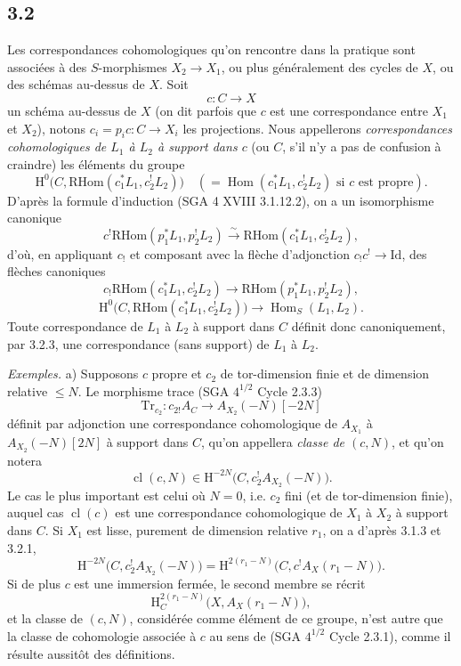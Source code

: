 \documentclass[11pt]{article}
\renewcommand{\H}{\mathrm{H}}
\DeclareMathOperator{\Hom}{Hom}
\providecommand{\RHom}{\mathrm{RHom}}
\providecommand{\Id}{\mathrm{Id}}
\providecommand{\RHom}{\mathrm{RHom}}
\providecommand{\Hom}{\operatorname{Hom}}
\providecommand{\RHom}{\mathrm R\mathcal{H}om}
\providecommand{\RHom}{\mathrm{RHom}}
\providecommand{\Hom}{\operatorname{Hom}}
\begin{document}
\subsection*{3.2}
Les correspondances cohomologiques qu'on rencontre dans la pratique sont associées à des $S$-morphismes $X_2\to X_1$, ou plus généralement des cycles de $X$, ou des schémas au-dessus de $X$. Soit
\[
c:C\longrightarrow X
\]
un schéma au-dessus de $X$ (on dit parfois que $c$ est une correspondance entre $X_1$ et $X_2$), notons $c_i=p_ic:C\to X_i$ les projections. Nous appellerons \emph{correspondances cohomologiques de $L_1$ à $L_2$ à support dans $c$} (ou $C$, s'il n'y a pas de confusion à craindre) les éléments du groupe
\[
\H^0\bigl(C,\RHom(c_1^*L_1,c_2^!L_2)\bigr)
\quad(=\Hom(c_1^*L_1,c_2^!L_2)\text{ si }c\text{ est propre}).
\]
D'après la formule d'induction (SGA 4 XVIII 3.1.12.2), on a un isomorphisme canonique
\begin{equation}
c^!\RHom(p_1^*L_1,p_2^!L_2)
\xrightarrow{\sim}
\RHom(c_1^*L_1,c_2^!L_2),
\tag{3.2.1}
\end{equation}
d'où, en appliquant $c_!$ et composant avec la flèche d'adjonction $c_!c^!\to \Id$, des flèches canoniques
\begin{equation}
c_!\RHom(c_1^*L_1,c_2^!L_2)
\longrightarrow
\RHom(p_1^*L_1,p_2^!L_2),
\tag{3.2.2}
\end{equation}
\begin{equation}
\H^0\bigl(C,\RHom(c_1^*L_1,c_2^!L_2)\bigr)
\longrightarrow
\Hom_S(L_1,L_2).
\tag{3.2.3}
\end{equation}
Toute correspondance de $L_1$ à $L_2$ à support dans $C$ définit donc canoniquement, par 3.2.3, une correspondance (sans support) de $L_1$ à $L_2$.

\emph{Exemples.} a) Supposons $c$ propre et $c_2$ de tor-dimension finie et de dimension relative $\leq N$. Le morphisme trace (SGA $4^{1/2}$ Cycle 2.3.3)
\[
\mathrm{Tr}_{c_2}:c_{2!}A_C\longrightarrow A_{X_2}(-N)[-2N]
\]
définit par adjonction une correspondance cohomologique de $A_{X_1}$ à $A_{X_2}(-N)[2N]$ à support dans $C$, qu'on appellera \emph{classe de $(c,N)$}, et qu'on notera
\begin{equation}
\operatorname{cl}(c,N)\in \H^{-2N}\bigl(C,c_2^!A_{X_2}(-N)\bigr).
\tag{3.2.4}
\end{equation}
Le cas le plus important est celui où $N=0$, i.e. $c_2$ fini (et de tor-dimension finie), auquel cas $\operatorname{cl}(c)$ est une correspondance cohomologique de $X_1$ à $X_2$ à support dans $C$. Si $X_1$ est lisse, purement de dimension relative $r_1$, on a d'après 3.1.3 et 3.2.1,
\begin{equation}
\H^{-2N}\bigl(C,c_2^!A_{X_2}(-N)\bigr)
=
\H^{2(r_1-N)}\bigl(C,c^!A_X(r_1-N)\bigr).
\tag{3.2.5}
\end{equation}
Si de plus $c$ est une immersion fermée, le second membre se récrit
\[
\H^{2(r_1-N)}_C\bigl(X,A_X(r_1-N)\bigr),
\]
et la classe de $(c,N)$, considérée comme élément de ce groupe, n'est autre que la classe de cohomologie associée à $c$ au sens de (SGA $4^{1/2}$ Cycle 2.3.1), comme il résulte aussitôt des définitions.
\end{document}
